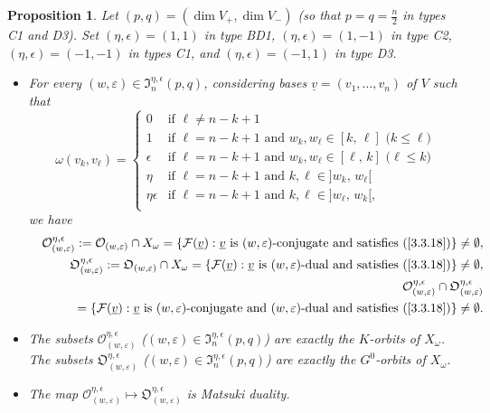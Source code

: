 \documentclass{amsart}
\newtheorem{proposition}{Proposition}
\theoremstyle{definition}
\begin{document}
\begin{proposition}
\label{P3}
Let $(p,q)=(\dim V_+,\dim V_-)$ (so that $p=q=\frac{n}{2}$ in types C1 and D3).
Set 
$(\eta,\epsilon)=(1,1)$ in type BD1,
$(\eta,\epsilon)=(1,-1)$ in type C2,
$(\eta,\epsilon)=(-1,-1)$ in types C1, and 
$(\eta,\epsilon)=(-1,1)$ in type D3.
\begin{itemize}
\item[(a)] For every $(w,\varepsilon)\in\mathfrak{I}_n^{\eta,\epsilon}(p,q)$,
considering bases $\underline{v}=(v_1,\ldots,v_n)$ of $V$ such that
\begin{equation}
\label{3.3.18}
\omega(v_k,v_\ell)=\left\{\begin{array}{ll} 0 & \mbox{if $\ell\not=n-k+1$} %
\\ 
1 & \mbox{if $\ell=n-k+1$ and $w_k,w_\ell\in[k,\,\ell]$ ($k\leq\ell$)} \\ 
\epsilon & \mbox{if $\ell=n-k+1$ and $w_k,w_\ell\in[\ell,\,k]$ ($\ell\leq k$)} \\
\eta & \mbox{if $\ell=n-k+1$ and $k,\ell\in]w_k,\,w_\ell[$} \\
\eta\epsilon & \mbox{if $\ell=n-k+1$ and $k,\ell\in]w_\ell,\,w_k[$,} \\
\end{array}\right.
\end{equation}
we have
\begin{eqnarray*}
 & & \mathcal{O}^{\eta,\epsilon}_{(w,\varepsilon)}:=\mathcal{O}_{(w,\varepsilon)}\cap X_\omega=\{\mathcal{F}(\underline{v}):\underline{v}\mbox{ is $(w,\varepsilon)$-conjugate and satisfies (\ref{3.3.18})}\}\not=\emptyset, \\
 & & \mathfrak{O}^{\eta,\epsilon}_{(w,\varepsilon)}:=\mathfrak{O}_{(w,\varepsilon)}\cap X_\omega=\{\mathcal{F}(\underline{v}):\underline{v}\mbox{ is $(w,\varepsilon)$-dual and satisfies (\ref{3.3.18})}\}\not=\emptyset, \\
 & & \mathcal{O}_{(w,\varepsilon)}^{\eta,\epsilon}\cap\mathfrak{O}_{(w,\varepsilon)}^{\eta,\epsilon}
 \\
 &&\phantom{aaa}=\{\mathcal{F}(\underline{v}):\underline{v}\mbox{ is $(w,\varepsilon)$-conjugate and $(w,\varepsilon)$-dual and satisfies (\ref{3.3.18})}\}\not=\emptyset.
\end{eqnarray*}
\item[(b)] The subsets $\mathcal{O}_{(w,\varepsilon)}^{\eta,\epsilon}$ ($(w,\varepsilon)\in\mathfrak{I}_n^{\eta,\epsilon}(p,q)$) are exactly the $K$-orbits of $X_\omega$. 
The subsets $\mathfrak{O}_{(w,\varepsilon)}^{\eta,\epsilon}$ ($(w,\varepsilon)\in\mathfrak{I}_n^{\eta,\epsilon}(p,q)$) are exactly the $G^0$-orbits of $X_\omega$.
\item[(c)] The map $\mathcal{O}_{(w,\varepsilon)}^{\eta,\epsilon}\mapsto \mathfrak{O}_{(w,\varepsilon)}^{\eta,\epsilon}$ is Matsuki duality.
\end{itemize}
\end{proposition}
\end{document}
